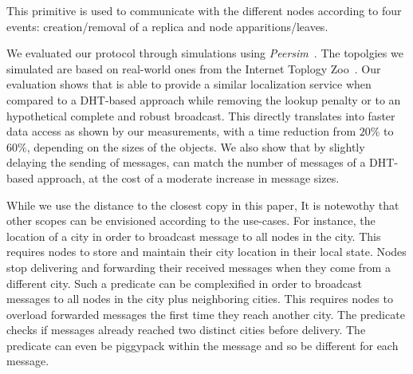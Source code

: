 This primitive is used to communicate with the different nodes
according to four events: creation/removal of a replica and node
apparitions/leaves. 


We evaluated our protocol through simulations using \textit{Peersim}~\cite{montresor2009peersim}. The topolgies we simulated are based on real-world ones from the Internet Toplogy
Zoo~\cite{knight2011internet}.  Our evaluation shows that \NAME is able to
provide a similar localization service when compared to a DHT-based
approach while removing the lookup penalty or to an hypothetical complete and robust broadcast. This directly translates
into faster data access as shown by our measurements, with a time
reduction from $20\%$ to $60\%$, depending on the sizes of the
objects. %
We also show that by slightly delaying the sending of messages, \NAME
can match the number of messages of a DHT-based approach, at the cost
of a moderate increase in message sizes.



While we use the distance to the closest copy in this paper, It is
notewothy that other scopes can be envisioned according to the
use-cases.  For instance, the location of a city in order to broadcast
message to all nodes in the city.  This requires nodes to store and
maintain their city location in their local state. Nodes stop
delivering and forwarding their received messages when they come from
a different city. Such a predicate can be complexified in order to
broadcast messages to all nodes in the city plus neighboring
cities. This requires nodes to overload forwarded messages the first
time they reach another city. The predicate checks if messages already
reached two distinct cities before delivery.  The predicate can even
be piggypack within the message and so be different for each
message.



